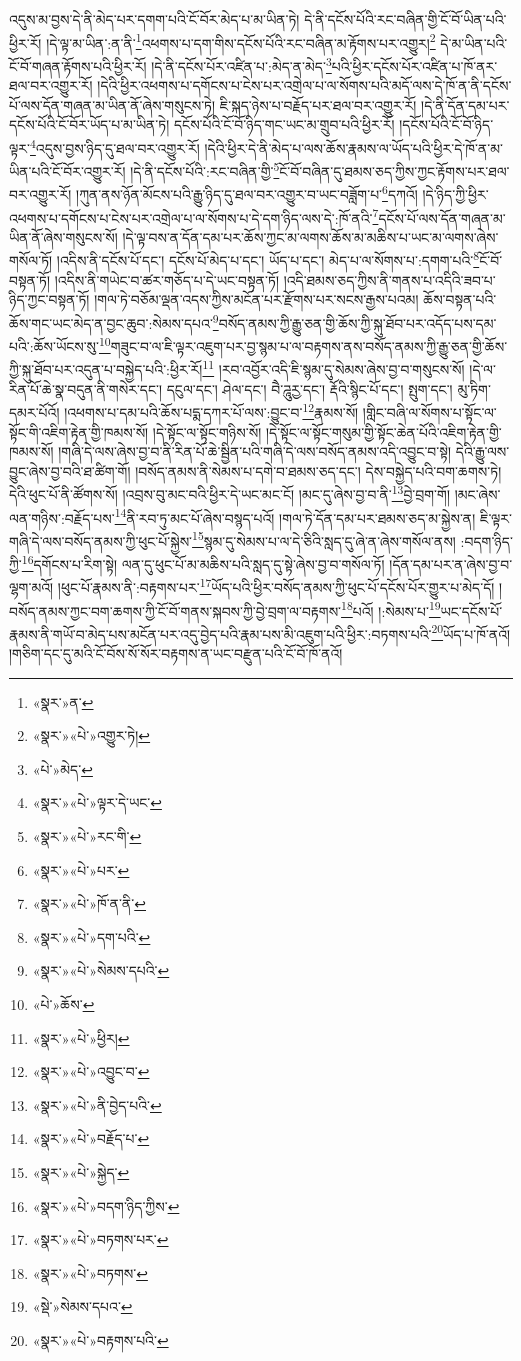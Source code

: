 འདུས་མ་བྱས་དེ་ནི་མེད་པར་དགག་པའི་ངོ་བོར་མེད་པ་མ་ཡིན་ཏེ། དེ་ནི་དངོས་པོའི་རང་བཞིན་གྱི་ངོ་བོ་ཡིན་པའི་ཕྱིར་རོ། །དེ་ལྟ་མ་ཡིན་:ན་ནི་\footnote{«སྣར་»ན་}འཕགས་པ་དག་གིས་དངོས་པོའི་རང་བཞིན་མ་རྟོགས་པར་འགྱུར།\footnote{«སྣར་»«པེ་»འགྱུར་ཏེ།} དེ་མ་ཡིན་པའི་ངོ་བོ་གཞན་རྟོགས་པའི་ཕྱིར་རོ། །དེ་ནི་དངོས་པོར་འཛིན་པ་:མེད་ན་མེད་\footnote{«པེ་»མེད་}པའི་ཕྱིར་དངོས་པོར་འཛིན་པ་ཁོ་ནར་ཐལ་བར་འགྱུར་རོ། །དེའི་ཕྱིར་འཕགས་པ་དགོངས་པ་ངེས་པར་འགྲེལ་པ་ལ་སོགས་པའི་མདོ་ལས་དེ་ཁོ་ན་ནི་དངོས་པོ་ལས་དོན་གཞན་མ་ཡིན་ནོ་ཞེས་གསུངས་ཏེ། ཇི་སྐད་ཉེས་པ་བརྗོད་པར་ཐལ་བར་འགྱུར་རོ། །དེ་ནི་དོན་དམ་པར་དངོས་པོའི་ངོ་བོར་ཡོད་པ་མ་ཡིན་ཏེ། དངོས་པོའི་ངོ་བོ་ཉིད་གང་ཡང་མ་གྲུབ་པའི་ཕྱིར་རོ། །དངོས་པོའི་ངོ་བོ་ཉིད་ལྟར་\footnote{«སྣར་»«པེ་»ལྟར་དེ་ཡང་}འདུས་བྱས་ཉིད་དུ་ཐལ་བར་འགྱུར་རོ། །དེའི་ཕྱིར་དེ་ནི་མེད་པ་ལས་ཆོས་རྣམས་ལ་ཡོད་པའི་ཕྱིར་དེ་ཁོ་ན་མ་ཡིན་པའི་ངོ་བོར་འགྱུར་རོ། །དེ་ནི་དངོས་པོའི་:རང་བཞིན་གྱི་\footnote{«སྣར་»«པེ་»རང་གི་}ངོ་བོ་བཞིན་དུ་ཐམས་ཅད་ཀྱིས་ཀྱང་རྟོགས་པར་ཐལ་བར་འགྱུར་རོ། །ཀུན་ནས་ཉོན་མོངས་པའི་རྒྱུ་ཉིད་དུ་ཐལ་བར་འགྱུར་བ་ཡང་བཟློག་པ་\footnote{«སྣར་»«པེ་»པར་}དཀའོ། །དེ་ཉིད་ཀྱི་ཕྱིར་འཕགས་པ་དགོངས་པ་ངེས་པར་འགྲེལ་པ་ལ་སོགས་པ་དེ་དག་ཉིད་ལས་དེ་:ཁོ་ནའི་\footnote{«སྣར་»«པེ་»ཁོ་ན་ནི་}དངོས་པོ་ལས་དོན་གཞན་མ་ཡིན་ནོ་ཞེས་གསུངས་སོ། །དེ་ལྟ་བས་ན་དོན་དམ་པར་ཆོས་ཀྱང་མ་ལགས་ཆོས་མ་མཆིས་པ་ཡང་མ་ལགས་ཞེས་གསོལ་ཏོ། །འདིས་ནི་དངོས་པོ་དང་། དངོས་པོ་མེད་པ་དང་། ཡོད་པ་དང་། མེད་པ་ལ་སོགས་པ་:དགག་པའི་\footnote{«སྣར་»«པེ་»དག་པའི་}ངོ་བོ་བསྟན་ཏོ། །འདིས་ནི་གཡེང་བ་ཚར་གཅོད་པ་དེ་ཡང་བསྟན་ཏོ། །འདི་ཐམས་ཅད་ཀྱིས་ནི་གནས་པ་འདིའི་ཟབ་པ་ཉིད་ཀྱང་བསྟན་ཏོ། །གལ་ཏེ་བཅོམ་ལྡན་འདས་ཀྱིས་མངོན་པར་རྫོགས་པར་སངས་རྒྱས་པའམ། ཆོས་བསྟན་པའི་ཆོས་གང་ཡང་མེད་ན་བྱང་ཆུབ་:སེམས་དཔའ་\footnote{«སྣར་»«པེ་»སེམས་དཔའི་}བསོད་ནམས་ཀྱི་རྒྱུ་ཅན་གྱི་ཆོས་ཀྱི་སྐུ་ཐོབ་པར་འདོད་པས་དམ་པའི་:ཆོས་ཡོངས་སུ་\footnote{«པེ་»ཆོས་}གཟུང་བ་ལ་ཇི་ལྟར་འཇུག་པར་བྱ་སྙམ་པ་ལ་བརྟགས་ནས་བསོད་ནམས་ཀྱི་རྒྱུ་ཅན་གྱི་ཆོས་ཀྱི་སྐུ་ཐོབ་པར་འདུན་པ་བསྐྱེད་པའི་:ཕྱིར་རོ།\footnote{«སྣར་»«པེ་»ཕྱིར།} །རབ་འབྱོར་འདི་ཇི་སྙམ་དུ་སེམས་ཞེས་བྱ་བ་གསུངས་སོ། །དེ་ལ་རིན་པོ་ཆེ་སྣ་བདུན་ནི་གསེར་དང་། དངུལ་དང་། ཤེལ་དང་། བཻ་ཌཱུརྱ་དང་། རྡོའི་སྙིང་པོ་དང་། སྤུག་དང་། མུ་ཏིག་དམར་པོའོ། །འཕགས་པ་དམ་པའི་ཆོས་པདྨ་དཀར་པོ་ལས་:བྱུང་བ་\footnote{«སྣར་»«པེ་»འབྱུང་བ་}རྣམས་སོ། །གླིང་བཞི་ལ་སོགས་པ་སྟོང་ལ་སྟོང་གི་འཇིག་རྟེན་གྱི་ཁམས་སོ། །དེ་སྟོང་ལ་སྟོང་གཉིས་སོ། །དེ་སྟོང་ལ་སྟོང་གསུམ་གྱི་སྟོང་ཆེན་པོའི་འཇིག་རྟེན་གྱི་ཁམས་སོ། །གཞི་དེ་ལས་ཞེས་བྱ་བ་ནི་རིན་པོ་ཆེ་སྦྱིན་པའི་གཞི་དེ་ལས་བསོད་ནམས་འདི་འབྱུང་བ་སྟེ། དེའི་རྒྱུ་ལས་བྱུང་ཞེས་བྱ་བའི་ཐ་ཚིག་གོ། །བསོད་ནམས་ནི་སེམས་པ་དགེ་བ་ཐམས་ཅད་དང་། དེས་བསྐྱེད་པའི་བག་ཆགས་ཏེ། དེའི་ཕུང་པོ་ནི་ཚོགས་སོ། །འབྲས་བུ་མང་བའི་ཕྱིར་དེ་ཡང་མང་ངོ། །མང་དུ་ཞེས་བྱ་བ་ནི་\footnote{«སྣར་»«པེ་»ནི་བྱེད་པའི་}བྱེ་བྲག་གོ། །མང་ཞེས་ལན་གཉིས་:བརྗོད་པས་\footnote{«སྣར་»«པེ་»བརྗོད་པ་}ནི་རབ་ཏུ་མང་པོ་ཞེས་བསྙད་པའོ། །གལ་ཏེ་དོན་དམ་པར་ཐམས་ཅད་མ་སྐྱེས་ན། ཇི་ལྟར་གཞི་དེ་ལས་བསོད་ནམས་ཀྱི་ཕུང་པོ་སྐྱེས་\footnote{«སྣར་»«པེ་»སྐྱེད་}སྙམ་དུ་སེམས་པ་ལ་དེ་ཅིའི་སླད་དུ་ཞེ་ན་ཞེས་གསོལ་ནས། :བདག་ཉིད་ཀྱི་\footnote{«སྣར་»«པེ་»བདག་ཉིད་ཀྱིས་}དགོངས་པ་རིག་སྟེ། ལན་དུ་ཕུང་པོ་མ་མཆིས་པའི་སླད་དུ་སྟེ་ཞེས་བྱ་བ་གསོལ་ཏོ། །དོན་དམ་པར་ན་ཞེས་བྱ་བ་ལྷག་མའོ། །ཕུང་པོ་རྣམས་ནི་:བརྟགས་པར་\footnote{«སྣར་»«པེ་»བཏགས་པར་}ཡོད་པའི་ཕྱིར་བསོད་ནམས་ཀྱི་ཕུང་པོ་དངོས་པོར་གྱུར་པ་མེད་དོ། །བསོད་ནམས་ཀྱང་བག་ཆགས་ཀྱི་ངོ་བོ་གནས་སྐབས་ཀྱི་བྱེ་བྲག་ལ་བརྟགས་\footnote{«སྣར་»«པེ་»བཏགས་}པའོ། །:སེམས་པ་\footnote{«སྡེ་»སེམས་དཔའ་}ཡང་དངོས་པོ་རྣམས་ནི་གཡོ་བ་མེད་པས་མངོན་པར་འདུ་བྱེད་པའི་རྣམ་པས་མི་འཇུག་པའི་ཕྱིར་:བཏགས་པའི་\footnote{«སྣར་»«པེ་»བརྟགས་པའི་}ཡོད་པ་ཁོ་ནའོ། །གཅིག་དང་དུ་མའི་ངོ་བོས་སོ་སོར་བརྟགས་ན་ཡང་བརྫུན་པའི་ངོ་བོ་ཁོ་ནའོ། 